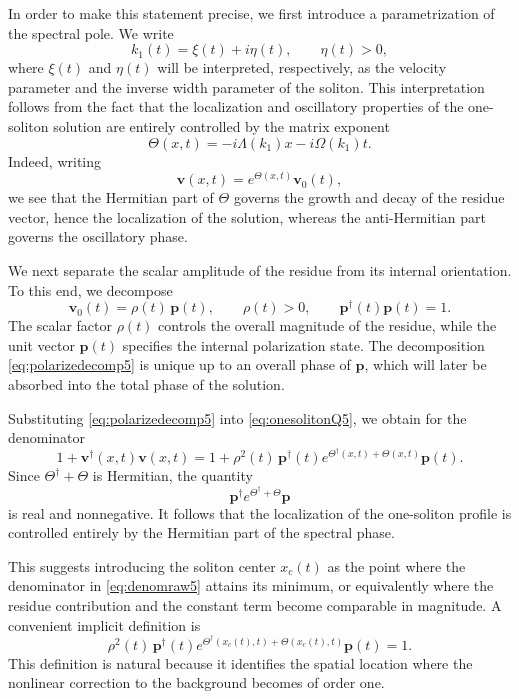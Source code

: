 \documentclass[11pt]{amsart}
\theoremstyle{definition}
\numberwithin{equation}{section}
\begin{document}
In order to make this statement precise, we first introduce a parametrization of the spectral pole. We write
\begin{equation}
k_1(t)=\xi(t)+i\eta(t),
\qquad \eta(t)>0,
\label{eq:k1param5}
\end{equation}
where $\xi(t)$ and $\eta(t)$ will be interpreted, respectively, as the velocity parameter and the inverse width parameter of the soliton. This interpretation follows from the fact that the localization and oscillatory properties of the one-soliton solution are entirely controlled by the matrix exponent
\begin{equation}
\Theta(x,t)=-i\Lambda(k_1)x-i\Omega(k_1)t.
\label{eq:ThetaMatrix5}
\end{equation}
Indeed, writing
\begin{equation}
\mathbf{v}(x,t)=e^{\Theta(x,t)}\mathbf{v}_0(t),
\label{eq:vTheta5}
\end{equation}
we see that the Hermitian part of $\Theta$ governs the growth and decay of the residue vector, hence the localization of the solution, whereas the anti-Hermitian part governs the oscillatory phase.

We next separate the scalar amplitude of the residue from its internal orientation. To this end, we decompose
\begin{equation}
\mathbf{v}_0(t)=\rho(t)\,\mathbf{p}(t),
\qquad
\rho(t)>0,
\qquad
\mathbf{p}^\dagger(t)\mathbf{p}(t)=1.
\label{eq:polarizedecomp5}
\end{equation}
The scalar factor $\rho(t)$ controls the overall magnitude of the residue, while the unit vector $\mathbf{p}(t)$ specifies the internal polarization state. The decomposition \eqref{eq:polarizedecomp5} is unique up to an overall phase of $\mathbf{p}$, which will later be absorbed into the total phase of the solution.

Substituting \eqref{eq:polarizedecomp5} into \eqref{eq:onesolitonQ5}, we obtain for the denominator
\begin{equation}
1+\mathbf{v}^\dagger(x,t)\mathbf{v}(x,t)
=
1+\rho^2(t)\,\mathbf{p}^\dagger(t)e^{\Theta^\dagger(x,t)+\Theta(x,t)}\mathbf{p}(t).
\label{eq:denomraw5}
\end{equation}
Since $\Theta^\dagger+\Theta$ is Hermitian, the quantity
\[
\mathbf{p}^\dagger e^{\Theta^\dagger+\Theta}\mathbf{p}
\]
is real and nonnegative. It follows that the localization of the one-soliton profile is controlled entirely by the Hermitian part of the spectral phase.

This suggests introducing the soliton center $x_c(t)$ as the point where the denominator in \eqref{eq:denomraw5} attains its minimum, or equivalently where the residue contribution and the constant term become comparable in magnitude. A convenient implicit definition is
\begin{equation}
\rho^2(t)\,\mathbf{p}^\dagger(t)e^{\Theta^\dagger(x_c(t),t)+\Theta(x_c(t),t)}\mathbf{p}(t)=1.
\label{eq:centerdef5}
\end{equation}
This definition is natural because it identifies the spatial location where the nonlinear correction to the background becomes of order one.
\end{document}
